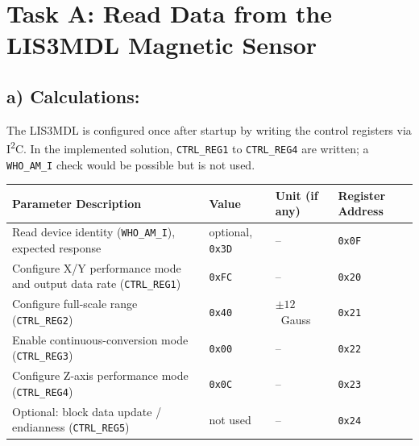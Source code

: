 
\section{Task A: Read Data from the LIS3MDL Magnetic Sensor}

\subsection{a) Calculations:}

The LIS3MDL is configured once after startup by writing the control registers via I\textsuperscript{2}C. In the implemented solution, \texttt{CTRL\_REG1} to \texttt{CTRL\_REG4} are written; a \texttt{WHO\_AM\_I} check would be possible but is not used.

\begin{table}[H]
	\centering
	\begin{tabularx}{\textwidth}{|>{\raggedright\arraybackslash}X|>{\raggedright\arraybackslash}p{3cm}|>{\raggedright\arraybackslash}p{2.4cm}|>{\raggedright\arraybackslash}p{4.2cm}|}
		\hline
		\textbf{Parameter Description}                                            & \textbf{Value}          & \textbf{Unit (if any)} & \textbf{Register Address} \\ \hline
		Read device identity (\texttt{WHO\_AM\_I}), expected response             & optional, \texttt{0x3D} & --                     & \texttt{0x0F}             \\ \hline
		Configure X/Y performance mode and output data rate (\texttt{CTRL\_REG1}) & \texttt{0xFC}           & --                     & \texttt{0x20}             \\ \hline
		Configure full-scale range (\texttt{CTRL\_REG2})                          & \texttt{0x40}           & $\pm 12$~Gauss         & \texttt{0x21}             \\ \hline
		Enable continuous-conversion mode (\texttt{CTRL\_REG3})                   & \texttt{0x00}           & --                     & \texttt{0x22}             \\ \hline
		Configure Z-axis performance mode (\texttt{CTRL\_REG4})                   & \texttt{0x0C}           & --                     & \texttt{0x23}             \\ \hline
		Optional: block data update / endianness (\texttt{CTRL\_REG5})            & not used                & --                     & \texttt{0x24}             \\ \hline
	\end{tabularx}
\end{table}

